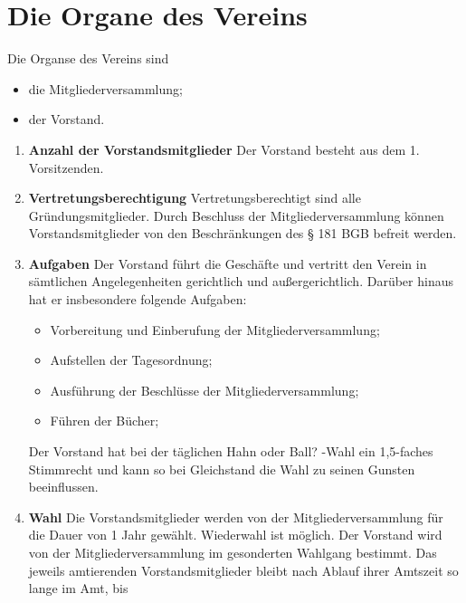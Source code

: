 \documentclass{scrartcl}
\begin{document}
    \section{Die Organe des Vereins}
        Die Organse des Vereins sind
        \begin{itemize}
            \item die Mitgliederversammlung;
            \item der Vorstand.
        \end{itemize}
        \begin{enumerate}
            \item \textbf{Anzahl der Vorstandsmitglieder} \newline
                Der Vorstand besteht aus dem 1. Vorsitzenden.
            \item \textbf{Vertretungsberechtigung} \newline
                Vertretungsberechtigt sind alle Gründungsmitglieder. 
                Durch Beschluss der Mitgliederversammlung können Vorstandsmitglieder von den Beschränkungen des § 181 BGB befreit werden.
            \item \textbf{Aufgaben} \newline
                Der Vorstand führt die Geschäfte und vertritt den Verein in sämtlichen Angelegenheiten
                gerichtlich und außergerichtlich. Darüber hinaus hat er insbesondere folgende Aufgaben:
                \begin{itemize}
                    \item Vorbereitung und Einberufung der Mitgliederversammlung;
                    \item Aufstellen der Tagesordnung;
                    \item Ausführung der Beschlüsse der Mitgliederversammlung;
                    \item Führen der Bücher;
                \end{itemize}
                Der Vorstand hat bei der täglichen \dq Hahn oder Ball? \dq-Wahl ein 1,5-faches Stimmrecht und kann so bei Gleichstand die Wahl zu seinen Gunsten beeinflussen.
            \item \textbf{Wahl} \newline
                Die Vorstandsmitglieder werden von der Mitgliederversammlung für die Dauer von 1 Jahr
                gewählt. Wiederwahl ist möglich. Der Vorstand wird von der
                Mitgliederversammlung im gesonderten Wahlgang bestimmt. 
                Das jeweils amtierenden Vorstandsmitglieder bleibt nach Ablauf ihrer Amtszeit so lange im Amt, bis

\end{enumerate}
\end{document}
